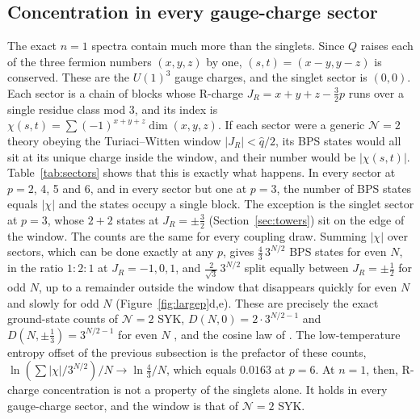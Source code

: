 \documentclass[10pt]{article}
\begin{document}
\subsection{Concentration in every gauge-charge sector}

The exact $n=1$ spectra contain much more than the singlets. Since $Q$ raises each of the three fermion numbers
$(x,y,z)$ by one, $(s,t)=(x-y,y-z)$ is conserved. These are the $U(1)^3$ gauge charges, and the singlet sector is
$(0,0)$. Each sector is a chain of blocks whose R-charge $J_R=x+y+z-\frac32p$ runs over a single residue class mod 3,
and its index is $\chi(s,t)=\sum(-1)^{x+y+z}\dim(x,y,z)$. If each sector were a generic $\mathcal N=2$ theory obeying
the Turiaci--Witten window $|J_R|<\hat q/2$, its BPS states would all sit at its unique charge inside the window, and
their number would be $|\chi(s,t)|$. Table~\ref{tab:sectors} shows that this is exactly what happens. In every sector
at $p=2$, 4, 5 and 6, and in every sector but one at $p=3$, the number of BPS states equals $|\chi|$ and the states
occupy a single block. The exception is the singlet sector at $p=3$, whose $2+2$ states at $J_R=\pm\frac32$
(Section~\ref{sec:towers}) sit on the edge of the window. The counts are the same for every coupling draw. Summing
$|\chi|$ over sectors, which can be done exactly at any $p$, gives $\frac43\,3^{N/2}$ BPS states for even $N$, in the
ratio $1{:}2{:}1$ at $J_R=-1,0,1$, and $\frac2{\sqrt3}\,3^{N/2}$ split equally between $J_R=\pm\frac12$ for odd $N$,
up to a remainder outside the window that disappears quickly for even $N$ and slowly for odd $N$
(Figure~\ref{fig:largep}d,e). These are precisely the exact ground-state counts of $\mathcal N=2$ SYK,
$D(N,0)=2\cdot3^{N/2-1}$ and $D(N,\pm\frac13)=3^{N/2-1}$ for even $N$ \cite{FGMS}, and the cosine law of \cite{TW}.
The low-temperature entropy offset of the previous subsection is the prefactor of these counts,
$\ln(\sum|\chi|/3^{N/2})/N\to\ln\frac43/N$, which equals $0.0163$ at $p=6$. At $n=1$, then, R-charge concentration
is not a property of the singlets alone. It holds in every gauge-charge sector, and the window is that of
$\mathcal N=2$ SYK.
\end{document}
